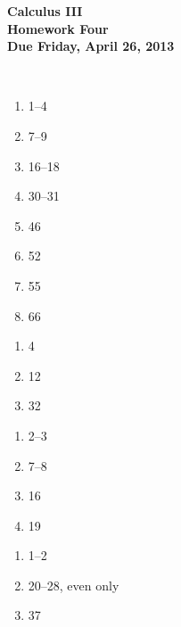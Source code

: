 \documentclass[12pt]{article}
\begin{document}
\pagestyle{empty}
 
\begin{center}
{\large {\bf Calculus III}}\\
\medskip
{\large {\bf Homework Four}}\\
\medskip
{ {\bf Due Friday, April 26, 2013}}\\
\end{center}

\hspace{2mm}\\


\begin{enumerate}
\setlength{\itemsep}{-1mm}
  \item 1--4
  \item 7--9
  \item 16--18
  \item 30--31
  \item 46
  \item 52
  \item 55
  \item 66 
\end{enumerate}


\begin{enumerate}
\setlength{\itemsep}{-1mm}
  \item 4
  \item 12
  \item 32
\end{enumerate}


\begin{enumerate}
\setlength{\itemsep}{-1mm}
  \item 2--3
  \item 7--8
  \item 16
  \item 19
\end{enumerate}


\begin{enumerate}
\setlength{\itemsep}{-1mm}
  \item 1--2
  \item 20--28, even only
  \item 37
\end{enumerate}
\end{document}
